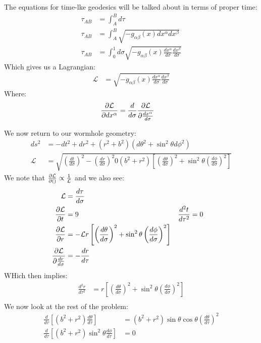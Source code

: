 The equations for time-lke geodesics will be talked about in terms of proper time:
\begin{align*}
	\tau_{AB} &= \int_A^Bd\tau \\
	\tau_{AB} &= \int_A^B\sqrt{-g_{\alpha\beta}(x) dx^\alpha dx^\beta} \\
	\tau_{AB} &= \int_0^1d\sigma\sqrt{-g_{\alpha\beta}(x) \frac{dx^\alpha}{d\sigma} \frac{dx^\beta}{d\sigma}}
\end{align*}
Which gives us a Lagrangian:
\begin{align*}
	\mathcal{L} &= \sqrt{-g_{\alpha\beta}(x)\frac{dx^\alpha}{d\sigma}\frac{dx^\beta}{d\sigma}}
\end{align*}
Where:
\begin{align*}
	\frac{\partial \mathcal{L}}{\partial dx^\alpha} &= \frac{d}{d\sigma} \frac{\partial \mathcal{L}}{\partial \frac{dx^\alpha}{d\sigma}}
\end{align*}

We now return to our wormhole geometry:
\begin{align*}
	ds^2 &= -dt^2 + dr^2 + (r^2 + b^2)(d\theta^2 + \sin^2\theta d\phi^2) \\
	\mathcal{L} &= \sqrt{\left(\frac{dt}{d\sigma}\right)^2 - \left(\frac{dr}{d\sigma}\right)^2 0 (b^2 + r^2)\left[\left(\frac{d\theta}{d\sigma}\right)^2 + \sin^2\theta \left(\frac{d\phi}{d\sigma}\right)^2\right]}
\end{align*}
We note that $\frac{\partial \mathcal{L}}{\partial ()} \propto \frac{1}{\mathcal{L}}$ and we also see:
\begin{align*}
	\mathcal{L} &= \frac{d\tau}{d\sigma} \\
	\frac{\partial \mathcal{L}}{\partial t} &= 9 &
	\frac{d^2 t}{d\tau^2} &= 0 \\
	\frac{\partial \mathcal{L}}{\partial r} &= -\mathcal{L}r\left[\left(\frac{d\theta}{d\sigma}\right)^2 + \sin^2\theta \left(\frac{d\phi}{d\sigma}\right)^2\right] \\
	\frac{\partial \mathcal{L}}{\partial \frac{dr}{d\sigma}} &= -\frac{d r}{d\tau}
\end{align*}
WHich then implies:
\begin{align*}
	\frac{d^2 r}{d\tau^2} &= r\left[\left(\frac{d\theta}{d\sigma}\right)^2 + \sin^2\theta \left(\frac{d\phi}{d\sigma}\right)^2\right] \\
\end{align*}
We now look at the rest of the problem:
\begin{align*}
	\frac{d}{d\tau} \left[(b^2 + r^2)\frac{d\theta}{d\tau}\right] &= (b^2 + r^2)\sin\theta\cos\theta\left(\frac{d\theta}{d\tau}\right)^2 \\
	\frac{d}{d\tau} \left[(b^2+ r^2)\sin^2\theta \frac{d\phi}{d\tau}\right] &= 0
\end{align*}

